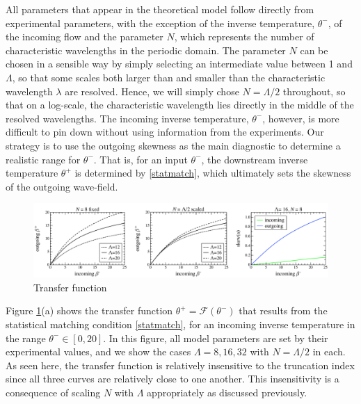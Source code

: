 \documentclass[11pt]{article}
\newcommand{\lam}{\lambda}
\newcommand{\lamfac}{N}
\newcommand{\thup}{\theta^{-}}
\newcommand{\thdn}{\theta^{+}}
\newcommand{\transf}{\mathcal{F}}
\begin{document}
All parameters that appear in the theoretical model follow directly from experimental parameters, with the exception of the inverse temperature, $\thup$, of the incoming flow and the parameter $\lamfac$, which represents the number of characteristic wavelengths in the periodic domain. The parameter $\lamfac$ can be chosen in a sensible way by simply selecting an intermediate value between 1 and $\Lambda$, so that some scales both larger than and smaller than the characteristic wavelength $\lam$ are resolved. Hence, we will simply chose $\lamfac = \Lambda/2$ throughout, so that on a log-scale, the characteristic wavelength lies directly in the middle of the resolved wavelengths. The incoming inverse temperature, $\thup$, however, is more difficult to pin down without using information from the experiments. Our strategy is to use the outgoing skewness as the main diagnostic to determine a realistic range for $\thup$. That is, for an input $\thup$, the downstream inverse temperature $\thdn$ is determined by \eqref{statmatch}, which ultimately sets the skewness of the outgoing wave-field.

\begin{figure}%
\begin{center}
\includegraphics[width = 0.99 \linewidth]{Figs/transfig.pdf}
\caption{
Transfer function
}
\label{transfig}
\end{center}
\end{figure}

Figure \ref{transfig}(a) shows the transfer function $\thdn = \transf(\thup)$ that results from the statistical matching condition \eqref{statmatch}, for an incoming inverse temperature in the range $\thup \in [0,20]$. In this figure, all model parameters are set by their experimental values, and we show the cases $\Lambda = 8, 16, 32$ with $\lamfac = \Lambda/2$ in each. As seen here, the transfer function is relatively insensitive to the truncation index since all three curves are relatively close to one another. This insensitivity is a consequence of scaling $\lamfac$ with $\Lambda$ appropriately as discussed previously.
\end{document}
